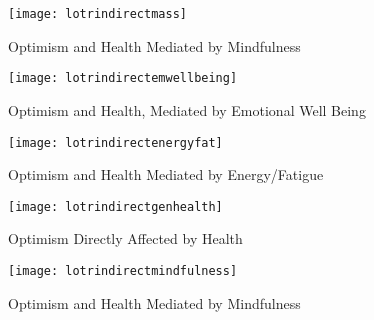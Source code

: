 \documentclass{article}
\begin{document}
\begin{figure}
\texttt{[image: lotrindirectmass]}  
  \caption{Optimism and Health Mediated by Mindfulness}
  \label{fig:lotrhealthmind}
\end{figure}





\begin{figure}
  \texttt{[image: lotrindirectemwellbeing]}
  \caption{Optimism and Health, Mediated by Emotional Well Being}
  \label{fig:lotrhealthemwellbeing}
\end{figure}



\begin{figure}
  \texttt{[image: lotrindirectenergyfat]}
  \caption{Optimism and Health Mediated by Energy/Fatigue}
  \label{fig:lotrhealthenergyfat}
\end{figure}




\begin{figure}
  \texttt{[image: lotrindirectgenhealth]}
  \caption{Optimism Directly Affected by Health}
  \label{fig:optindirectgenhealth}
\end{figure}


\begin{figure}
  \texttt{[image: lotrindirectmindfulness]}
  \caption{Optimism and Health Mediated by Mindfulness}
  \label{fig:lotrhealthmind2}
\end{figure}
\end{document}

